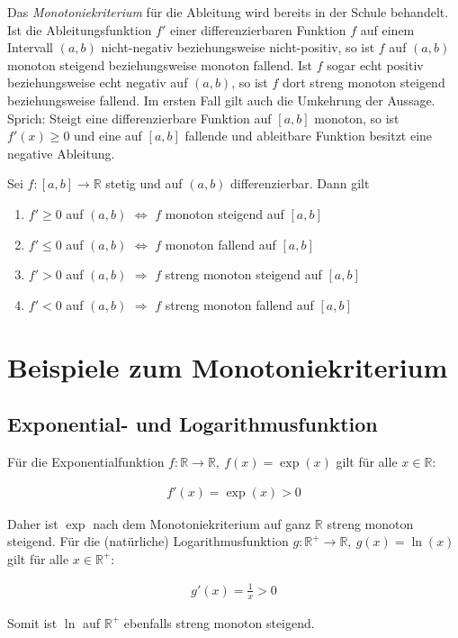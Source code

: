 \documentclass[fontsize=9pt,
               parskip=half-,
               DIV=14,
               listof=chapterentry,
               tocflat]{scrbook}
\begin{document}
Das \emph{Monotoniekriterium} für die Ableitung wird bereits in der Schule behandelt. Ist die Ableitungsfunktion $f'$ einer differenzierbaren Funktion $f$ auf einem Intervall $(a,b)$ nicht-negativ beziehungsweise nicht-positiv, so ist $f$ auf $(a,b)$ monoton steigend beziehungsweise monoton fallend. Ist $f$ sogar echt positiv beziehungsweise echt negativ auf $(a,b)$, so ist $f$ dort streng monoton steigend beziehungsweise fallend. Im ersten Fall gilt auch die Umkehrung der Aussage. Sprich: Steigt eine differenzierbare Funktion auf $[a,b]$ monoton, so ist $f'(x)\geq 0$ und eine auf $[a,b]$ fallende und ableitbare Funktion besitzt eine negative Ableitung.

\begin{theorem*}
Sei $f:[a,b]\to \mathbb {R} $ stetig und auf $(a,b)$ differenzierbar. Dann gilt

\begin{enumerate}
\item $f'\geq 0$ auf $(a,b)$ $\iff $ $f$ monoton steigend auf $[a,b]$
\item $f'\leq 0$ auf $(a,b)$ $\iff $ $f$ monoton fallend auf $[a,b]$
\item $f'>0$ auf $(a,b)$ $\Longrightarrow $ $f$ streng monoton steigend auf $[a,b]$
\item $f'<0$ auf $(a,b)$ $\Longrightarrow $ $f$ streng monoton fallend auf $[a,b]$
\end{enumerate}

\end{theorem*}

\section{Beispiele zum Monotoniekriterium}

\subsection{Exponential- und Logarithmusfunktion}

\begin{example*}
Für die Exponentialfunktion $f:\mathbb {R} \to \mathbb {R} ,\ f(x)=\exp(x)$ gilt für alle $x\in \mathbb {R} $:

\begin{align*}
f'(x)=\exp(x)>0
\end{align*}

Daher ist $\exp $ nach dem Monotoniekriterium auf ganz $\mathbb {R} $ streng monoton steigend. Für die (natürliche) Logarithmusfunktion $g:\mathbb {R} ^{+}\to \mathbb {R} ,\ g(x)=\ln(x)$ gilt für alle $x\in \mathbb {R} ^{+}$:

\begin{align*}
g'(x)={\frac {1}{x}}>0
\end{align*}

Somit ist $\ln $ auf $\mathbb {R} ^{+}$ ebenfalls streng monoton steigend.

\end{example*}
\end{document}
